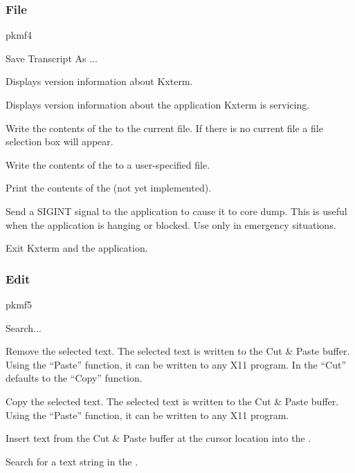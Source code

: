 \subsubsection*{File}
\begin{PICTf}[.25]{pkmf4}
\begin{DLsf}{Save Transcript As ...}
\item[About Kxterm...]
         Displays version information about Kxterm.
\item[About \{Appl.\} ...]
         Displays version information about the application
         Kxterm is servicing.
\item[Save Transcript]
         Write the contents of the \TP{} to the current
         file. If there is no current file a file selection box
         will appear.
\item[Save Transcript As...]
         Write the contents of the \TP{} to a user-specified
         file.
\item[Print...]
         Print the contents of the \TP{} (not yet implemented).
\item[Kill \{Appl.\}]
         Send a SIGINT signal to the application to cause it to
         core dump. This is useful when the application is hanging or
         blocked. Use only in emergency situations.
\item[Exit]
         Exit Kxterm and the application.
\end{DLsf}
\end{PICTf}

\subsubsection*{Edit}
\begin{PICTf}{pkmf5}
\begin{DLsf}{Search...}
\item[Cut]
         Remove the selected text. The selected text is written to the
         Cut \& Paste buffer. Using the ``Paste'' function, it can be
         written to any X11 program. In the \TP{} ``Cut''
         defaults to the ``Copy'' function.
\item[Copy]
         Copy the selected text. The selected text is written to the
         Cut \& Paste buffer. Using the ``Paste'' function, it can be
         written to any X11 program.
\item[Paste]
         Insert text from the Cut \& Paste buffer at the cursor location
         into the \INP{}.
\item[Search...]
         Search for a text string in the \TP{}.
\end{DLsf}
\end{PICTf}

